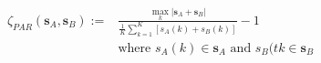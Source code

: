 \begin{equation}
\begin{split}
	\zeta_{PAR}(\textbf{s}_{A}, \textbf{s}_{B}) :=& \frac{\max_k \left| \textbf{s}_{A}+\textbf{s}_{B}\right|}{\frac{1}{K}\sum_{k=1}^{K}\left[{s}_{A}(k)+{s}_{B}(k)\right]} - 1\\
	& \text{where } {s}_{A}(k) \in \textbf{s}_{A} \text{ and } {s}_{B}(tk \in \textbf{s}_{B}
\end{split}
\label{ch1:equ:peak-to-average-definition}
\end{equation}